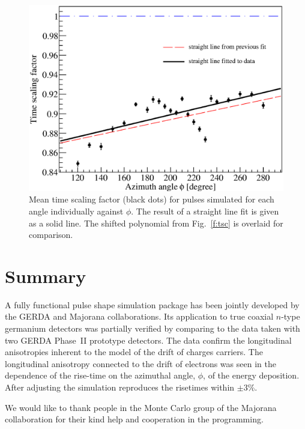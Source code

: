 \documentclass[epj]{svjour}
\begin{document}
\begin{figure}[htpb]
\centering
\includegraphics[width=\linewidth]{tsline}
\caption{Mean time scaling factor (black dots) for pulses simulated
for each angle individually against $\phi$. The result of a straight
line fit is given as a solid line. The shifted polynomial from
Fig.~\ref{f:tsc} is overlaid for comparison.}
\label{f:tsl}
\end{figure}

\section{Summary}
\label{s:sum}
A fully functional pulse shape simulation package has been jointly
developed by the GERDA and Majorana collaborations. Its application to
true coaxial $n$-type germanium detectors was partially verified by
comparing to the data taken with two GERDA Phase~II prototype
detectors. The data confirm the longitudinal anisotropies inherent to
the model of the drift of charges carriers. The longitudinal
anisotropy connected to the drift of electrons was seen in the
dependence of the rise-time on the azimuthal angle, $\phi$, of the
energy deposition. After adjusting the simulation reproduces the
risetimes within $\pm$3\%.

\begin{acknowledgement}
We would like to thank people in the Monte Carlo group of the Majorana
collaboration for their kind help and cooperation in the programming.
\end{acknowledgement}
\end{document}
